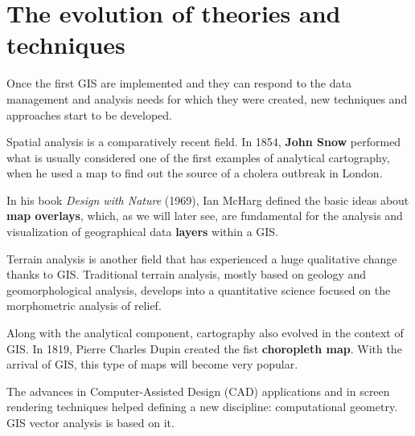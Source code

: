 \section{The evolution of theories and techniques}

Once the first GIS are implemented and they can respond to the data management and analysis needs for which they were created, new techniques and approaches start to be developed. 

Spatial analysis is a comparatively recent field. In 1854, \textbf{John Snow} performed what is usually considered one of the first examples of analytical cartography, when he used a map to find out the source of a cholera outbreak in London.

In his book \emph{Design with Nature} (1969), Ian McHarg defined the basic ideas about  \textbf{map overlays}, which, as we will later see, are fundamental for the analysis and visualization of geographical data \textbf{layers} within a GIS.

Terrain analysis is another field that has experienced a huge qualitative change thanks to GIS. Traditional terrain analysis, mostly based on geology and geomorphological analysis, develops into a quantitative science focused on the morphometric analysis of relief.

Along with the analytical component, cartography also evolved in the context of GIS. In 1819, Pierre Charles Dupin created the fist \textbf{choropleth map}. With the arrival of GIS, this type of maps will become very popular.

The advances in Computer-Assisted Design (CAD) applications and in screen rendering techniques helped defining a new discipline: computational geometry. GIS vector analysis is based on it.

\pagestyle{empty}
